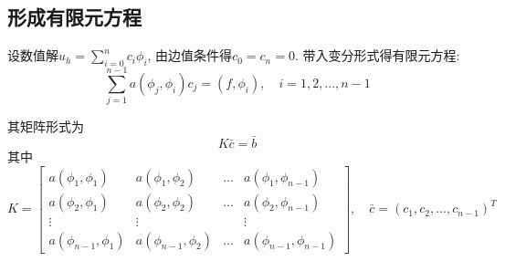 \documentclass[UTF8]{ctexart}
\begin{document}
\subsection{形成有限元方程}

设数值解$u_h = \sum_{i=0}^n c_i \phi_i $, 由边值条件得$c_0 = c_n = 0$.
带入变分形式得有限元方程:
$$
\sum_{j=1}^{n-1} a(\phi_j, \phi_i) c_j = (f, \phi_i), \quad i = 1, 2, ... , n-1
$$
\par 
其矩阵形式为
$$ K \bar{c} = \bar{b} $$
其中
$$
K = \begin{bmatrix}
		a(\phi_1,\phi_1) & a(\phi_1,\phi_2) & ... & a(\phi_1,\phi_{n-1}) \\
		a(\phi_2,\phi_1) & a(\phi_2,\phi_2) & ... & a(\phi_2,\phi_{n-1}) \\
		\vdots           & \vdots           &     & \vdots  			 \\
		a(\phi_{n-1},\phi_1) & a(\phi_{n-1},\phi_2) & ... & a(\phi_{n-1},\phi_{n-1})
	\end{bmatrix}, \quad
\bar{c} = (c_1, c_2, ... , c_{n-1})^T 
$$
\end{document}
